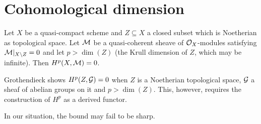 \documentclass[a4paper,parskip=half,numbers=enddot, DIV=12]{scrreprt}
\begin{document}
\section{Cohomological dimension}
\begin{prop}[Grothendieck]
Let $X$ be a quasi-compact scheme and $Z\subseteq X$ a closed subset which is Noetherian as topological space. %
Let $\mathcal{M}$ be a quasi-coherent sheave of $\mathcal{O}_X$-modules satisfying $\mathcal{M}\vert_{X\setminus Z}=0$ and let $p>\dim(Z)$ (the Krull dimension of $Z$, which may be infinite). Then $H^p(X,\mathcal{M})=0$.
\end{prop}
\begin{rem*}
	Grothendieck shows $H^p(Z,\mathcal{G})=0$ when $Z$ is a Noetherian topological space, $\mathcal{G}$ a sheaf of abelian groups on it and $p>\dim(Z)$. This, however, requires the construction of $H^p$ as a derived functor.
	
	In our situation, the bound may fail to be sharp.
\end{rem*}
\end{document}
